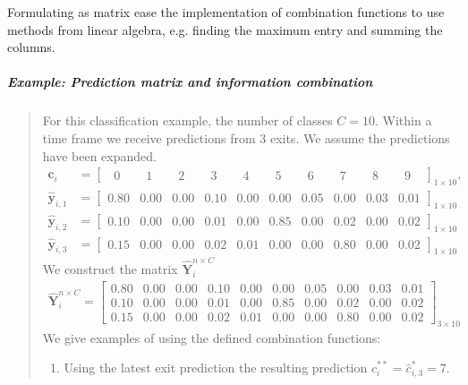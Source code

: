 Formulating as matrix ease the implementation of combination functions to use methods from linear algebra, e.g. finding the maximum entry and summing the columns.

\subparagraph{Example: Prediction matrix and information combination} 
\blockquote[]{	 	
	For this classification example, the number of classes $C=10$. Within a time frame we receive predictions from 3 exits. We assume the predictions have been expanded.
	\begin{align*}
	\mathbf{c}_{i} &= \begin{bmatrix}
	\phantom{0}0\phantom{.0} & \phantom{0}1\phantom{.0} & \phantom{0}2\phantom{.0} & \phantom{0}3\phantom{.0} & \phantom{0}4\phantom{.0} & \phantom{0}5\phantom{.0} & \phantom{0}6\phantom{.0} & \phantom{0}7\phantom{.0} & \phantom{0}8\phantom{.0} & \phantom{0}9\phantom{.0}
	\end{bmatrix}_{1 \times 10},\\
	\mathbf{\hat{y}}_{i,1}  &= \begin{bmatrix}
		0.80 & 0.00 & 0.00 & 0.10 & 0.00 & 0.00 & 0.05 & 0.00 & 0.03 & 0.01
	\end{bmatrix}_{1 \times 10}
	\\
	\mathbf{\hat{y}}_{i,2}  &= \begin{bmatrix}
		0.10 & 0.00 & 0.00 & 0.01 & 0.00 & 0.85 & 0.00 & 0.02 & 0.00 & 0.02
	\end{bmatrix}_{1 \times 10}
		\\
	\mathbf{\hat{y}}_{i,3}  &= \begin{bmatrix}
		0.15 & 0.00 & 0.00 & 0.02 & 0.01 & 0.00 & 0.00 & 0.80 & 0.00 & 0.02
	\end{bmatrix}_{1 \times 10}
	\end{align*}
	We construct the matrix $ \bm{\hat{Y}}_{i}^{n \times C} $
	\begin{align*}
			\bm{\hat{Y}}_{i}^{n \times C} =
		\begin{bmatrix}
		0.80 & 0.00 & 0.00 & 0.10 & 0.00 & 0.00 & 0.05 & 0.00 & 0.03 & 0.01 \\
		0.10 & 0.00 & 0.00 & 0.01 & 0.00 & 0.85 & 0.00 & 0.02 & 0.00 & 0.02 \\
		0.15 & 0.00 & 0.00 & 0.02 & 0.01 & 0.00 & 0.00 & 0.80 & 0.00 & 0.02 
		\end{bmatrix}_{3 \times 10}
	\end{align*}
	We give examples of using the defined combination functions:
	\begin{enumerate}
		\item Using the latest exit prediction the resulting prediction $  \hat{c}^{**}_{i} = \hat{c}^*_{i,3} = 7$.

\end{enumerate}}
